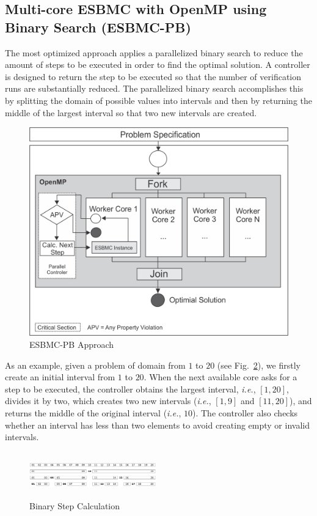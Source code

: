 \subsection{Multi-core ESBMC with OpenMP using Binary Search (ESBMC-PB)}
\label{Multi-core-ESBMC-with-OpenMP-using-Binary-Search}

The most optimized approach applies a parallelized binary search to reduce the amount of steps to be executed in order to find the optimal solution. A controller is designed to return the step to be executed so that the number of verification runs are substantially reduced. The parallelized binary search accomplishes this by splitting the domain of possible values into intervals and then by returning the middle of the largest interval so that two new intervals are created.
%
\begin{figure}[ht]
	\centering
  \includegraphics[scale=0.75]{Image/esbmc-parallel-Controler.png} 
	\caption{ESBMC-PB Approach}
	\label{ESBMC-Binary-Approach}
\end{figure}

As an example, given a problem of domain from $1$ to $20$ (see Fig.~\ref{Binary-Step-Calculation}), we firstly create an initial interval from $1$ to $20$. When the next available core asks for a step to be executed, the controller obtains the largest interval, {\it i.e.}, $\left[1,20\right]$, divides it by two, which creates two new intervals ({\it i.e.}, $\left[1,9\right]$ and $\left[11,20\right]$), and returns the middle of the original interval ({\it i.e.}, $10$). The controller also checks whether an interval has less than two elements to avoid creating empty or invalid intervals.
%
\begin{figure}[ht]
	\centering
  \includegraphics[width=0.49\textwidth, height=75px]{Image/Fig4.png}
	\caption{Binary Step Calculation}
	\label{Binary-Step-Calculation}
\end{figure}

